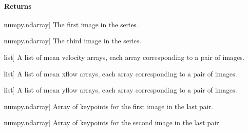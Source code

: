 \documentclass[letterpaper,10pt,english]{sphinxmanual}
\begin{document}
\begin{fulllineitems}
\begin{description}
\end{description}


\paragraph{Returns}
\label{\detokenize{akhdefo_functions:id8}}\begin{description}
\sphinxlineitem{image1}{[}numpy.ndarray{]}
\sphinxAtStartPar
The first image in the series.

\sphinxlineitem{image3}{[}numpy.ndarray{]}
\sphinxAtStartPar
The third image in the series.

\sphinxlineitem{mean\_vel\_list}{[}list{]}
\sphinxAtStartPar
A list of mean velocity arrays, each array corresponding to a pair of images.

\sphinxlineitem{mean\_flowx\_list}{[}list{]}
\sphinxAtStartPar
A list of mean x\sphinxhyphen{}flow arrays, each array corresponding to a pair of images.

\sphinxlineitem{mean\_flowy\_list}{[}list{]}
\sphinxAtStartPar
A list of mean y\sphinxhyphen{}flow arrays, each array corresponding to a pair of images.

\sphinxlineitem{points1\_i}{[}numpy.ndarray{]}
\sphinxAtStartPar
Array of keypoints for the first image in the last pair.

\sphinxlineitem{points2}{[}numpy.ndarray{]}
\sphinxAtStartPar
Array of keypoints for the second image in the last pair.

\end{description}

\end{fulllineitems}


\begin{fulllineitems}
\label{\detokenize{akhdefo_functions:akhdefo_functions.Akhdefo_GOI.calculate_slopes_std_and_residuals}}
\pysigstartsignatures
{}
\pysigstopsignatures
\end{fulllineitems}

\end{document}
